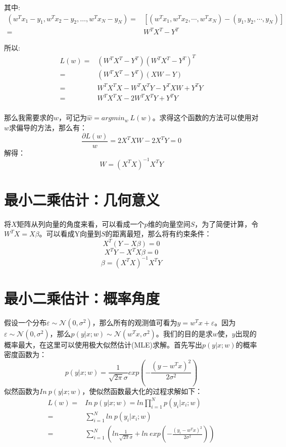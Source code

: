 \documentclass[a4paper]{article}
\begin{document}
其中:
\begin{align}
    (w^T x_1-y_1, w^T x_2-y_2, \dots, w^T x_N-y_N) = & [(w^Tx_1, w^Tx_2, \cdots, w^Tx_N)-(y_1,y_2,\cdots,y_N)] \\
    \nonumber = & W^TX^T-Y^T
\end{align}

所以:
\begin{align}
    L(w) = & (W^TX^T-Y^T)(W^TX^T-Y^T)^T \\
    \nonumber = & (W^TX^T-Y^T)(XW-Y) \\
    \nonumber = & W^TX^TX - W^TX^TY - Y^TXW + Y^TY\\
    \nonumber = & W^TX^TX - 2W^TX^TY + Y^TY\\
\end{align}

那么我需要求的$w$，可记为$\hat{w}=argmin_{w} \ L(w)$。求得这个函数的方法可以使用对$w$求偏导的方法，那么有：
\begin{equation}
    \frac{\partial L(w)}{w}=2X^TXW-2X^TY=0
\end{equation}
解得：
\begin{equation}
    W=(X^TX)^{-1}X^TY
\end{equation}
    

\section{最小二乘估计：几何意义}
将$X$矩阵从列向量的角度来看，可以看成一个$p$维的向量空间$S$，为了简便计算，令$W^TX=X\beta$。可以看成Y向量到$S$的距离最短，那么将有约束条件：
\begin{equation}
    X^T(Y-X\beta) = 0
\end{equation}
\begin{equation}
    X^TY-X^TX\beta=0
\end{equation}
\begin{equation}
    \beta=(X^TX)^{-1}X^TY
\end{equation}

\section{最小二乘估计：概率角度}
假设一个分布$\varepsilon \sim \mathcal{N}(0,\sigma^2)$，那么所有的观测值可看为$y = w^Tx + \varepsilon$。因为$\varepsilon \sim \mathcal{N}(0,\sigma^2)$，那么$p(y|x;w) \sim \mathcal{N}(w^Tx, \sigma^2)$。我们的目的是求$w$使，$y$出现的概率最大，在这里可以使用极大似然估计(MLE)求解。首先写出$p(y|x;w)$的概率密度函数为：
\begin{equation}
    p(y|x;w)=\frac{1}{\sqrt{2\pi}\sigma}exp\left(-\frac{(y-w^Tx)^2}{2\sigma^2}\right)
\end{equation}
似然函数为$In\ p(y|x;w)$，使似然函数最大化的过程求解如下：
\begin{align}
    L(w) = & In\ p(y|x;w) = ln\prod_{i=1}^Np(y_i|x_i;w) \\
         = & \sum_{i=1}^Nln\ p(y_i|x_i;w) \\ 
         = & \sum_{i=1}^N \left( ln\frac{1}{\sqrt{2\pi}\sigma} + ln\ exp\left( -\frac{(y_i - w^Tx)^2}{2\sigma^2} \right) \right)
\end{align}
\end{document}
